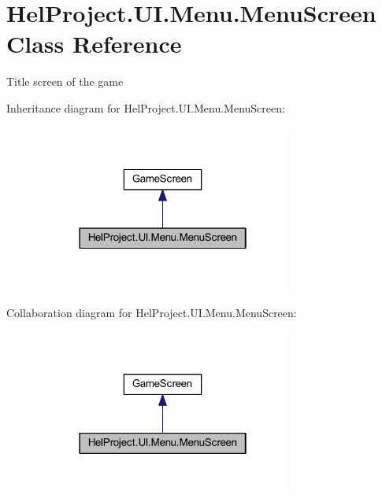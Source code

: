 \hypertarget{class_hel_project_1_1_u_i_1_1_menu_1_1_menu_screen}{}\section{Hel\+Project.\+U\+I.\+Menu.\+Menu\+Screen Class Reference}
\label{class_hel_project_1_1_u_i_1_1_menu_1_1_menu_screen}


Title screen of the game  




Inheritance diagram for Hel\+Project.\+U\+I.\+Menu.\+Menu\+Screen\+:\nopagebreak
\begin{figure}[H]
\begin{center}
\leavevmode
\includegraphics[width=238pt]{class_hel_project_1_1_u_i_1_1_menu_1_1_menu_screen__inherit__graph}
\end{center}
\end{figure}


Collaboration diagram for Hel\+Project.\+U\+I.\+Menu.\+Menu\+Screen\+:\nopagebreak
\begin{figure}[H]
\begin{center}
\leavevmode
\includegraphics[width=238pt]{class_hel_project_1_1_u_i_1_1_menu_1_1_menu_screen__coll__graph}
\end{center}
\end{figure}
